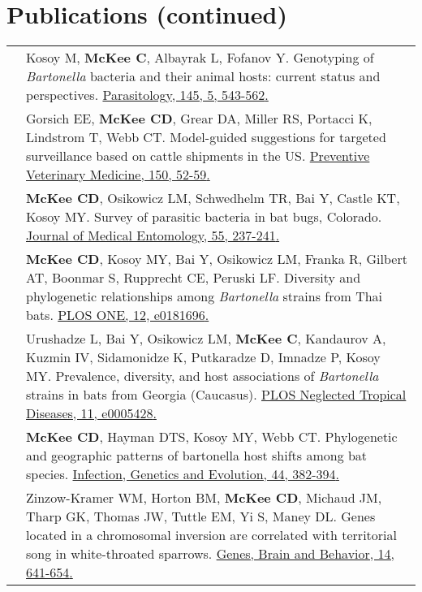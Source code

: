 \documentclass[letterpaper]{deedy-resume} %
\begin{document}
\section{Publications (continued)}
\begin{tabular}{>{\raggedright\arraybackslash}p{2cm}p{16cm}}

2018 & Kosoy M, \textbf{McKee C}, Albayrak L, Fofanov Y. Genotyping of \textit{Bartonella} bacteria and their animal hosts: current status and perspectives. \href{https://doi.org/10.1017/S0031182017001263}{\textcolor{special}{Parasitology, 145, 5, 543-562}.}\\

2018 & Gorsich EE, \textbf{McKee CD}, Grear DA, Miller RS, Portacci K, Lindstrom T, Webb CT. Model-guided suggestions for targeted surveillance based on cattle shipments in the US. \href{https://doi.org/10.1016/j.prevetmed.2017.12.004}{\textcolor{special}{Preventive Veterinary Medicine, 150, 52-59}.}\\

2018 & \textbf{McKee CD}, Osikowicz LM, Schwedhelm TR, Bai Y, Castle KT, Kosoy MY. Survey of parasitic bacteria in bat bugs, Colorado. \href{https://doi.org/10.1093/jme/tjx155}{\textcolor{special}{Journal of Medical Entomology, 55, 237-241}.}\\

2017 & \textbf{McKee CD}, Kosoy MY, Bai Y, Osikowicz LM, Franka R, Gilbert AT, Boonmar S, Rupprecht CE, Peruski LF. Diversity and phylogenetic relationships among \textit{Bartonella} strains from Thai bats. \href{https://doi.org/10.1371/journal.pone.0181696}{\textcolor{special}{PLOS ONE, 12, e0181696}.}\\

2017 & Urushadze L, Bai Y, Osikowicz LM, \textbf{McKee C}, Kandaurov A, Kuzmin IV, Sidamonidze K, Putkaradze D, Imnadze P, Kosoy MY. Prevalence, diversity, and host associations of \textit{Bartonella} strains in bats from Georgia (Caucasus). \href{https://doi.org/10.1371/journal.pntd.0005428}{\textcolor{special}{PLOS Neglected Tropical Diseases, 11, e0005428}.}\\

2016 & \textbf{McKee CD}, Hayman DTS, Kosoy MY, Webb CT. Phylogenetic and geographic patterns of bartonella host shifts among bat species. \href{https://doi.org/10.1016/j.meegid.2016.07.033}{\textcolor{special}{Infection, Genetics and Evolution, 44, 382-394}.}\\

2015 & Zinzow-Kramer WM, Horton BM, \textbf{McKee CD}, Michaud JM, Tharp GK, Thomas JW, Tuttle EM, Yi S, Maney DL. Genes located in a chromosomal inversion are correlated with territorial song in white-throated sparrows. \href{http://doi.wiley.com/10.1111/gbb.12252}{\textcolor{special}{Genes, Brain and Behavior, 14, 641-654}.}\\


\end{tabular}
\end{document}
